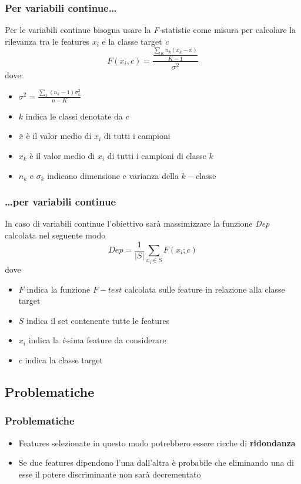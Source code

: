 \documentclass{beamer}
\begin{document}
\begin{frame}
	\frametitle{Per variabili continue\dots}
	Per le variabili continue bisogna usare la \emph{F-}statistic come misura per calcolare la rilevanza tra le features $x_i$ e la classe target \emph{c}
	$$ F(x_i,c) = \frac{\frac{\sum\limits_{K}{n_k(\bar{x_k}-\bar{x})}}{K-1}}{\sigma^2}$$
	dove: 
	\begin{itemize}
		\item $\sigma^2=\frac{ \sum\limits_{k}{(n_k-1)\sigma^2_k}}{n-K}$
		\item $k$ indica le classi denotate da $c$
		\item $\bar{x}$ è il valor medio di $x_i$ di tutti i campioni
		\item $\bar{x_k}$ è il valor medio di $x_i$ di tutti i campioni di classe $k$
		\item $n_k$ e $\sigma_k$ indicano dimensione e varianza della $k-$classe
	\end{itemize}
\end{frame}

\begin{frame}
	\frametitle{\dots per variabili continue}
	In caso di variabili continue l'obiettivo sarà massimizzare la funzione \emph{Dep} calcolata nel seguente modo
	$$Dep= \frac{1}{|S|} \sum\limits_{x_i \in S} F(x_i;c)$$
	dove 
	\begin{itemize}
		\item $F$ indica la funzione $F-test$ calcolata sulle feature in relazione alla classe target
		\item $S$ indica il set contenente tutte le features
		\item $x_i$ indica la \emph{i-}sima feature da considerare
		\item $c$ indica la classe target
	\end{itemize}
\end{frame}

\subsection{Problematiche}
\begin{frame}
	\frametitle{Problematiche}
	\begin{itemize}
		\item Features selezionate in questo modo potrebbero essere ricche di \textbf{ridondanza}\newline
		\item Se due features dipendono l'una dall'altra è probabile che eliminando una di esse il potere discriminante non sarà decrementato
	\end{itemize}
\end{frame}
\end{document}
